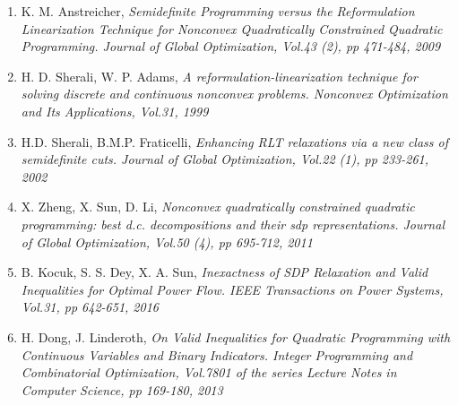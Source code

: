 \documentclass[12pt]{book}
\theoremstyle{definition}
\begin{document}
\begin{enumerate}
\item K. M. Anstreicher, \it Semidefinite Programming versus the Reformulation Linearization Technique for Nonconvex Quadratically Constrained Quadratic Programming. \rm Journal of Global Optimization, Vol.43 (2), pp 471-484, 2009
\label{AnstreicherSDPvsRLT}
%
\item H. D. Sherali, W. P. Adams, \it A reformulation-linearization technique for solving discrete and continuous nonconvex problems. \rm
 Nonconvex Optimization and Its Applications, Vol.31, 1999
 \label{SheraliAdamsRLT1}
%
\item H.D. Sherali, B.M.P. Fraticelli, \it Enhancing RLT relaxations via a new class of semidefinite
cuts. \rm Journal of Global Optimization, Vol.22 (1), pp 233-261, 2002
\label{SheraliEnhancingRLT}
%
\item X. Zheng, X. Sun, D. Li, \it Nonconvex quadratically constrained quadratic programming: best d.c. decompositions and their sdp representations. \rm Journal of Global Optimization, Vol.50 (4), pp 695-712, 2011
\label{ZhengDCdecomp}
%
\item B. Kocuk, S. S. Dey, X. A. Sun, \it Inexactness of SDP Relaxation and Valid Inequalities for Optimal Power Flow. \rm
IEEE Transactions on Power Systems, Vol.31, pp 642-651, 2016
\label{InexactSDPandValidIneq}
%
\item H. Dong, J. Linderoth, \it On Valid Inequalities for Quadratic Programming with Continuous Variables and Binary Indicators. \rm  
Integer Programming and Combinatorial Optimization, Vol.7801 of the series Lecture Notes in Computer Science, pp 169-180, 2013
\label{onValidIneqforQP}






\end{enumerate}
\end{document}
